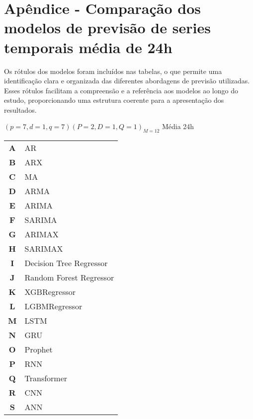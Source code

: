 
\section{Ap\^endice - Compara\c c\~ao dos modelos de previs\~ao de series temporais m\'edia de 24h}\label{sec:comtb24}


Os rótulos dos modelos foram incluídos nas tabelas, o que permite uma identificação clara e organizada das diferentes abordagens de previsão utilizadas. Esses rótulos facilitam a compreensão e a referência aos modelos ao longo do estudo, proporcionando uma estrutura coerente para a apresentação dos resultados.

$(p = 7,d = 1,q = 7) (P = 2,D = 1,Q = 1)_{M = 12}$ Média 24h
 
\begin{table}[!htpb]
	\begin{tabular}{cl}
		\textbf{A} & AR                      \\
		\textbf{B} & ARX                     \\
		\textbf{C} & MA                      \\
		\textbf{D} & ARMA                    \\
		\textbf{E} & ARIMA                   \\
		\textbf{F} & SARIMA                  \\
		\textbf{G} & ARIMAX                  \\
		\textbf{H} & SARIMAX                 \\
		\textbf{I} & Decision Tree Regressor  \\
		\textbf{J} & Random Forest Regressor \\
		\textbf{K} & XGBRegressor            \\
		\textbf{L} & LGBMRegressor           \\
		\textbf{M} & LSTM                    \\
		\textbf{N} & GRU                     \\
		\textbf{O} & Prophet                 \\
		\textbf{P} & RNN                     \\
		\textbf{Q} & Transformer            \\
		\textbf{R} & CNN\\
		\textbf{S} & ANN
		
	\end{tabular}
\end{table}

\newpage

